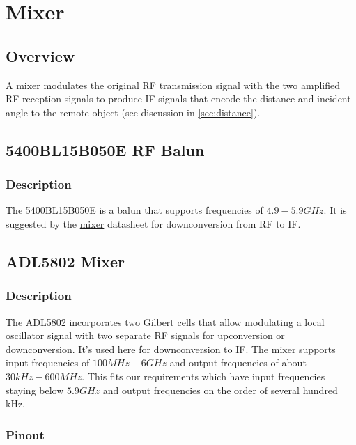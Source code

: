 \section{Mixer}
\label{sec:mixer}

\subsection{Overview}
\label{sec:mixer-overview}

A mixer modulates the original RF transmission signal with the two amplified RF reception signals to
produce IF signals that encode the distance and incident angle to the remote object (see discussion
in \cref{sec:distance}).

\subsection{5400BL15B050E RF Balun}
\label{sec:5400bl15b050e}

\subsubsection{Description}
\label{sec:5400bl15b050e-description}

The 5400BL15B050E is a balun that supports frequencies of $4.9 - 5.9 \si{GHz}$. It is suggested by
the \hyperref[sec:adl5802]{mixer} datasheet for downconversion from RF to IF\@.

\subsection{ADL5802 Mixer}
\label{sec:adl5802}

\subsubsection{Description}
\label{sec:adl5802-description}

The ADL5802 incorporates two Gilbert cells that allow modulating a local oscillator signal with two
separate RF signals for upconversion or downconversion. It's used here for downconversion to
IF\@. The mixer supports input frequencies of $100 \si{MHz} - 6 \si{GHz}$ and output frequencies of
about $30 \si{kHz} - 600 \si{MHz}$. This fits our requirements which have input frequencies staying
below $5.9 \si{GHz}$ and output frequencies on the order of several hundred kHz.

\subsubsection{Pinout}
\label{sec:adl5802-pinout}




